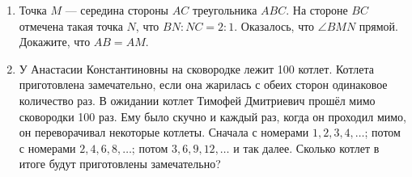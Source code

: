 \documentclass{article}
\begin{document}
\begin{enumerate}[label*=\arabic{enumi}.]
        \item Точка $M$ --- середина стороны $AC$ треугольника $ABC$.
        На стороне $BC$ отмечена такая точка $N$, что $BN:NC = 2:1$.
        Оказалось, что  $\angle BMN$ прямой.
        Докажите, что $AB = AM$.

        \item У Анастасии Константиновны на сковородке лежит 100 котлет.
        Котлета приготовлена замечательно, если она жарилась с обеих сторон одинаковое количество раз.
        В ожидании котлет Тимофей Дмитриевич прошёл мимо сковородки 100 раз.
        Ему было скучно и каждый раз, когда он проходил мимо, он переворачивал некоторые котлеты.
        Сначала с номерами $1,2,3,4,\dotsc$; потом с номерами $2,4,6,8,\dotsc$; потом $3,6,9,12,\dotsc$ и так далее.
        Сколько котлет в итоге будут приготовлены замечательно?


    \end{enumerate}
\end{document}
